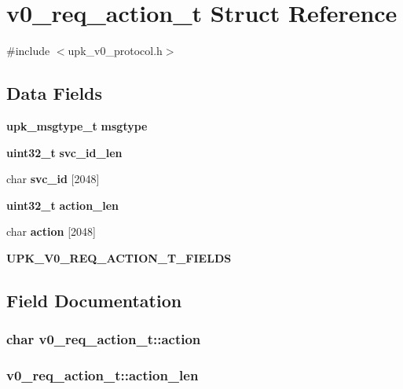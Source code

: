 \section{v0\_\-req\_\-action\_\-t Struct Reference}
\label{structv0__req__action__t}


{\ttfamily \#include $<$upk\_\-v0\_\-protocol.h$>$}

\subsection*{Data Fields}
\begin{DoxyCompactItemize}
\item 
{\bf upk\_\-msgtype\_\-t} {\bf msgtype}
\item 
{\bf uint32\_\-t} {\bf svc\_\-id\_\-len}
\item 
char {\bf svc\_\-id} [2048]
\item 
{\bf uint32\_\-t} {\bf action\_\-len}
\item 
char {\bf action} [2048]
\item 
{\bf UPK\_\-V0\_\-REQ\_\-ACTION\_\-T\_\-FIELDS}
\end{DoxyCompactItemize}


\subsection{Field Documentation}
\subsubsection[{action}]{\setlength{\rightskip}{0pt plus 5cm}char {\bf v0\_\-req\_\-action\_\-t::action}}\label{structv0__req__action__t_a77e6072f1d865bc665f69b79a888c446}
\subsubsection[{action\_\-len}]{ {\bf v0\_\-req\_\-action\_\-t::action\_\-len}}\label{structv0__req__action__t_a1712274defc5072e91754db302a3e3bb}
